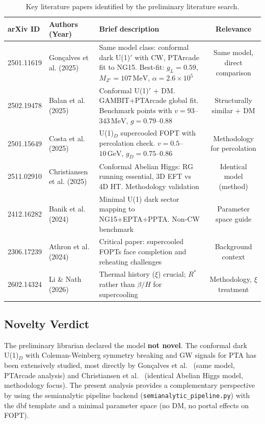 \documentclass[a4paper,11pt]{article}
\newcommand{\GeV}{\,\text{GeV}}
\newcommand{\MeV}{\,\text{MeV}}
\begin{document}
\begin{table}[htbp]
\centering
\caption{Key literature papers identified by the preliminary literature search.}
\label{tab:lit}
\begin{tabularx}{\textwidth}{llXc}
\toprule
arXiv ID & Authors (Year) & Brief description & Relevance \\
\midrule
2501.11619 & Gon\c{c}alves et al. (2025) & Same model class: conformal dark U(1)$'$ with CW, PTArcade fit to NG15. Best-fit: $g_L=0.59$, $M_{Z'} = 107\MeV$, $\alpha=2.6\times10^5$ & Same model, direct comparison \\
2502.19478 & Balan et al. (2025) & Conformal U(1)$'$ + DM. GAMBIT+PTArcade global fit. Benchmark points with $v=93$--$343\MeV$, $g=0.79$--$0.88$ & Structurally similar + DM \\
2501.15649 & Costa et al. (2025) & U(1)$_D$ supercooled FOPT with percolation check. $v=0.5$--$10\GeV$, $g_D=0.75$--$0.86$ & Methodology for percolation \\
2511.02910 & Christiansen et al. (2025) & Conformal Abelian Higgs: RG running essential, 3D EFT vs 4D HT. Methodology validation & Identical model (method) \\
2412.16282 & Banik et al. (2024) & Minimal U(1) dark sector mapping to NG15+EPTA+PPTA. Non-CW benchmark & Parameter space guide \\
2306.17239 & Athron et al. (2024) & Critical paper: supercooled FOPTs face completion and reheating challenges & Background context \\
2602.14324 & Li \& Nath (2026) & Thermal history ($\xi$) crucial; $R^*$ rather than $\beta/H$ for supercooling & Methodology, $\xi$ treatment \\
\bottomrule
\end{tabularx}
\end{table}

\subsection{Novelty Verdict}

The preliminary librarian declared the model {\bf not novel}. The conformal dark U(1)$_D$ with Coleman-Weinberg symmetry breaking and GW signals for PTA has been extensively studied, most directly by Gon\c{c}alves et al.~\cite{goncalves2025} (same model, PTArcade analysis) and Christiansen et al.~\cite{christiansen2025} (identical Abelian Higgs model, methodology focus). The present analysis provides a complementary perspective by using the semianalytic pipeline backend ({\tt semianalytic\_pipeline.py}) with the dbf template and a minimal parameter space (no DM, no portal effects on FOPT).
\end{document}
